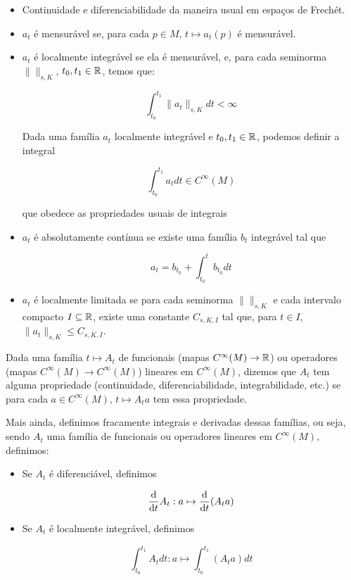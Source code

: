\begin{itemize}
    \item Continuidade e diferenciabilidade da maneira usual em espaços de Frechét.
    
    \item $a_t$ é mensurável se, para cada $p \in M$,
    $t \mapsto a_t(p)$ é mensurável.

    \item $a_t$ é localmente integrável se ela é mensurável, e,
    para cada seminorma $\|\|_{s,K}$,
    $t_0, t_1 \in \mathbb{R}$, temos que:

    $$\int_{t_0}^{t_1} \|a_t\|_{s,K} dt < \infty$$

    Dada uma família $a_t$ localmente integrável e $t_0, t_1 \in \mathbb{R}$, podemos 
    definir a integral

    $$\int_{t_0}^{t_1} a_t dt \in C^{\infty}(M)$$

    que obedece as propriedades usuais de integrais

    \item $a_t$ é absolutamente contínua se existe uma família $b_t$ integrável
    tal que

    $$a_t = b_{t_0} + \int_{t_0}^t b_{t_0} dt$$

    \item $a_t$ é localmente limitada se para cada seminorma $\|\|_{s,K}$
    e cada intervalo compacto $I \subseteq \mathbb{R}$, existe uma constante
    $C_{s,K,I}$ tal que, para $t \in I$, $\|a_t\|_{s,K} \leq C_{s,K,I}$.
\end{itemize}

Dada uma família $t \mapsto A_t$
de funcionais (mapas $C^\infty(M) \to \mathbb{R}$) ou operadores
(mapas $C^\infty(M) \to C^\infty(M)$) lineares em $C^\infty(M)$,
dizemos que $A_t$ tem alguma propriedade (continuidade,
diferenciabilidade, integrabilidade, etc.)
se para cada $a \in C^\infty(M)$, $t \mapsto A_t a$ tem essa propriedade.

Mais ainda, definimos fracamente integrais e derivadas dessas famílias, ou seja,
sendo $A_t$ uma família de funcionais ou operadores lineares em $C^\infty(M)$,
definimos:

\begin{itemize}
    \item Se $A_t$ é diferenciável,
    definimos 
    
    $$\frac{\text{d} }{\text{d} t}A_t : a \mapsto \frac{\text{d} }{\text{d} t}(A_ta)$$

    \item Se $A_t$ é localmente integrável, definimos
    
    $$\int_{t_0}^{t_1} A_t dt : a \mapsto \int_{t_0}^{t_1} (A_ta) dt$$
\end{itemize}

